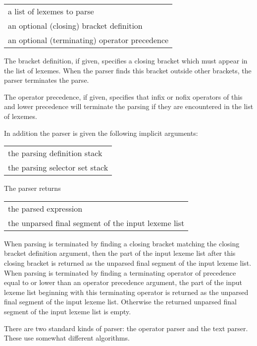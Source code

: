 \documentclass[12pt]{article}
\begin{document}
\begin{center}
\begin{tabular}{l}
a list of lexemes to parse \\
an optional (closing) bracket definition \\
an optional (terminating) operator precedence \\
\end{tabular}
\end{center}

The bracket definition, if given, specifies a closing bracket
which must appear in the list of lexemes.  When the parser
finds this bracket outside other brackets, the parser terminates
the parse.

The operator precedence, if given, specifies that infix or
nofix operators of this and lower precedence will terminate the parsing if
they are encountered in the list of lexemes.

In addition the parser is given the following implicit
arguments:

\begin{center}
\begin{tabular}{l}
the parsing definition stack \\
the parsing selector set stack
\end{tabular}
\end{center}

The parser returns

\begin{center}
\begin{tabular}{l}
the parsed expression \\
the unparsed final segment of the input lexeme list
\end{tabular}
\end{center}

When parsing is terminated by finding a closing bracket matching
the closing bracket definition argument, then the part of the
input lexeme list after this closing bracket is returned as the
unparsed final segment of the input lexeme list.  When parsing is
terminated by finding a terminating operator of precedence equal to or lower
than an operator precedence argument, the part of the input
lexeme list beginning with this terminating operator is returned as the
unparsed final segment of the input lexeme list.  Otherwise the
returned unparsed final segment of the input lexeme list is empty.

There are two standard kinds of parser: the operator parser
and the text parser.  These use somewhat different algorithms.
\end{document}
